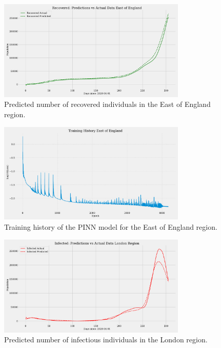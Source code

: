 \documentclass[12pt]{article}
\begin{document}
\begin{figure}[ht]
    \centering
    \includegraphics[width=0.8\textwidth]{images/pinn/R_predictions_East of England.pdf}
    \caption{Predicted number of recovered individuals in the East of England region.}
    \label{fig:R_predictions_East_of_England}
\end{figure}

\begin{figure}[ht]
    \centering
    \includegraphics[width=0.8\textwidth]{images/pinn/Training_History_East of England.pdf}
    \caption{Training history of the PINN model for the East of England region.}
    \label{fig:Training_History_East_of_England}
\end{figure}

\begin{figure}[ht]
    \centering
    \includegraphics[width=0.8\textwidth]{images/pinn/I_predictions_London Region.pdf}
    \caption{Predicted number of infectious individuals in the London region.}
    \label{fig:I_predictions_London}
\end{figure}
\end{document}
